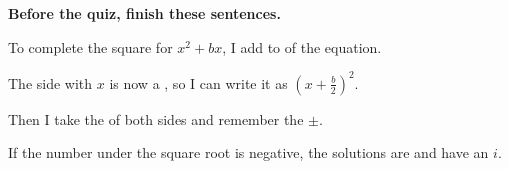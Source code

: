 \vspace{6pt}
\textbf{Before the quiz, finish these sentences.}

To complete the square for $x^2+bx$, I add \blank[3cm] to \blank[3cm] of the equation.

The side with $x$ is now a \blank[5cm], so I can write it as $\left(x+\tfrac{b}{2}\right)^2$.

Then I take the \blank[3cm] of both sides and remember the $\pm$.

If the number under the square root is negative, the solutions are \blank[3cm] and have an $i$.


